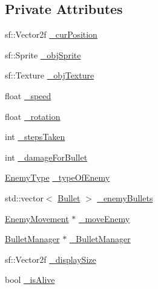 \subsection*{Private Attributes}
\begin{DoxyCompactItemize}
\item 
sf\+::\+Vector2f \hyperlink{class_enemy_aefebf6e5fb323b9b27510c26707d0013}{\+\_\+cur\+Position}
\item 
sf\+::\+Sprite \hyperlink{class_enemy_a299e3bbee6558cad0e9cd5dc510341a7}{\+\_\+obj\+Sprite}
\item 
sf\+::\+Texture \hyperlink{class_enemy_a9bfc9a676333f13aa3bc87dbabc036b5}{\+\_\+obj\+Texture}
\item 
float \hyperlink{class_enemy_a5ad8a827b28dd24331a434d1993d5c01}{\+\_\+speed}
\item 
float \hyperlink{class_enemy_ad00fabd2ca45f308cf3b0ead95c9bb82}{\+\_\+rotation}
\item 
int \hyperlink{class_enemy_a6c795cbaf685c2b4824601219c39192b}{\+\_\+steps\+Taken}
\item 
int \hyperlink{class_enemy_af922f36da4c166ab18091c297f7faa0e}{\+\_\+damage\+For\+Bullet}
\item 
\hyperlink{_enemy_8h_ac3e413a86119db4b031458c7259e268e}{Enemy\+Type} \hyperlink{class_enemy_a28e9fad6f896986b88f53895f6bba866}{\+\_\+type\+Of\+Enemy}
\item 
std\+::vector$<$ \hyperlink{class_bullet}{Bullet} $>$ \hyperlink{class_enemy_ab0fb1cab49fa8580cd6ba8ce3d70b32e}{\+\_\+enemy\+Bullets}
\item 
\hyperlink{class_enemy_movement}{Enemy\+Movement} $\ast$ \hyperlink{class_enemy_a3a0b038e3f79797e8e1ef32b1ec441e0}{\+\_\+move\+Enemy}
\item 
\hyperlink{class_bullet_manager}{Bullet\+Manager} $\ast$ \hyperlink{class_enemy_a5f5dbc651e786307c64b99b6a4219f99}{\+\_\+\+Bullet\+Manager}
\item 
sf\+::\+Vector2f \hyperlink{class_enemy_a27fcc8bffa13feb1097d41f4fa0532f8}{\+\_\+display\+Size}
\item 
bool \hyperlink{class_enemy_ae9c6779193a20e666d0d1ec4091d35d9}{\+\_\+is\+Alive}
\end{DoxyCompactItemize}
